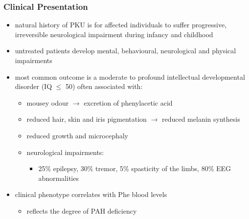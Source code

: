 \documentclass{scrartcl}
\begin{document}
\subsubsection{Clinical Presentation}
\label{sec:org2bd728f}
\begin{itemize}
\item natural history of PKU is for affected individuals to suffer
progressive, irreversible neurological impairment during infancy and
childhood
\item untreated patients develop mental, behavioural, neurological and
physical impairments
\item most common outcome is a moderate to profound intellectual
developmental disorder (IQ \(\le\) 50) often associated with:
\begin{itemize}
\item mousey odour \(\to\) excretion of phenylacetic acid
\item reduced hair, skin and iris pigmentation \(\to\) reduced melanin synthesis
\item reduced growth and microcephaly
\item neurological impairments:
\begin{itemize}
\item 25\% epilepsy, 30\% tremor, 5\% spasticity of the limbs, 80\% EEG abnormalities
\end{itemize}
\end{itemize}
\item clinical phenotype correlates with Phe blood levels
\begin{itemize}
\item reflects the degree of PAH deficiency
\end{itemize}
\end{itemize}
\end{document}
